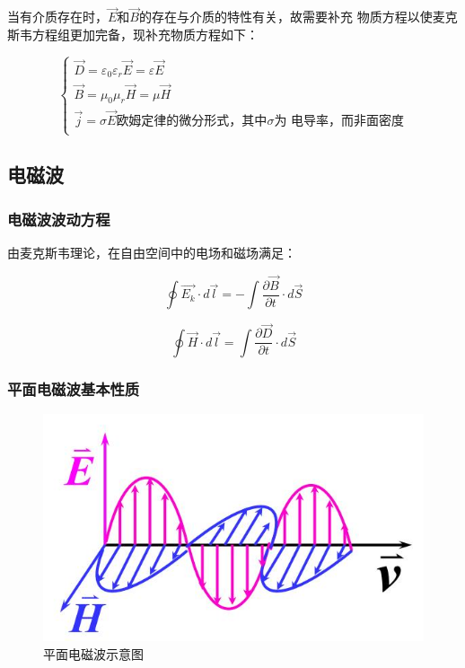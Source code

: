 \documentclass{ctexart}
\begin{document}
当有介质存在时，$\vec{E}$和$\vec{B}$的存在与介质的特性有关，故需要补充
物质方程以使麦克斯韦方程组更加完备，现补充物质方程如下：

\begin{equation*}
	\begin{cases}
		\vec{D}=\varepsilon_0\varepsilon_r \vec{E}=\varepsilon\vec{E}\\
		\vec{B}=\mu_0\mu_r\vec{H}=\mu \vec{H}\\
		\vec{j}=\sigma\vec{E}\text{欧姆定律的微分形式，其中}\sigma \text{为
		电导率，而非面密度}\\
	\end{cases}
\end{equation*}

\subsection{电磁波}

\subsubsection{电磁波波动方程}

由麦克斯韦理论，在自由空间中的电场和磁场满足：

$$\oint \vec{E_k}\cdot d\vec{l}=-\int \frac{\partial \vec{B}}{\partial t}\cdot d\vec{S}$$

$$\oint \vec{H}\cdot d\vec{l}=\int \frac{\partial \vec{D}}{\partial t}\cdot d\vec{S}$$

\subsubsection{平面电磁波基本性质}

\begin{figure}[h]
	\centering
	\includegraphics[scale=0.3]{images//chapter_14//figure_14.4.jpg} 
	\caption{平面电磁波示意图}\label{figure14.4}
\end{figure}
\end{document}

